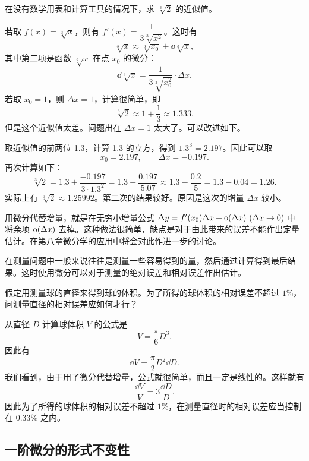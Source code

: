 \begin{xexample}[6.3.1]
在没有数学用表和计算工具的情况下，求 $\sqrt[3]{2}$ 的近似值。
\end{xexample}
\begin{xsolution}
若取 $f(x)=\sqrt[3]{x}$，则有 $f'(x)=\dfrac1{3\sqrt[3]{x^2}}$。这时有
\[
  \sqrt[3]{x}\approx\sqrt[3]{x_0}+\dd\sqrt[3]{x},
\]
其中第二项是函数 $\sqrt[3]{x}$ 在点 $x_0$ 的微分：
\[
  \dd\sqrt[3]{x}=\frac1{3\sqrt[3]{x_0^2}}\cdot\Delta x.
\]
若取 $x_0=1$，则 $\Delta x=1$，计算很简单，即
\[
  \sqrt[3]{2}\approx1+\frac13\approx1.333.
\]
但是这个近似值太差。问题出在 $\Delta x=1$ 太大了。可以改进如下。

取近似值的前两位 1.3，计算 1.3 的立方，得到 $1.3^3=2.197$。因此可以取
\[
  x_0=2.197,\qquad\Delta x=-0.197.
\]
再次计算如下：
\[
  \sqrt[3]{2}
  =1.3+\frac{-0.197}{3\cdot1.3^2}
  =1.3-\frac{0.197}{5.07}
  \approx1.3-\frac{0.2}{5}
  =1.3-0.04=1.26.
\]
实际上有 $\sqrt[3]{2}\approx1.25992$。第二次的结果较好。原因是这次的增量 $\Delta x$ 较小。
\end{xsolution}

\begin{xremark}
用微分代替增量，就是在无穷小增量公式 $\Delta y=f'(x_0)\Delta x+\littleo(\Delta x)\ (\Delta x\to0)$ 中将余项 $\mathrm{o}(\Delta x)$ 去掉。这种做法很简单，缺点是对于由此带来的误差不能作出定量估计。在第八章微分学的应用中将会对此作进一步的讨论。

在测量问题中一般来说往往是测量一些容易得到的量，然后通过计算得到最后结果。这时使用微分可以对于测量的绝对误差和相对误差作出估计。
\end{xremark}

\begin{xexample}[6.3.2]
假定用测量球的直径来得到球的体积。为了所得的球体积的相对误差不超过 $1\%$，问测量直径的相对误差应如何才行？
\end{xexample}
\begin{xsolution}
从直径 $D$ 计算球体积 $V$ 的公式是
\[
  V=\frac\pi6D^3.
\]
因此有
\[
  \dd V=\frac\pi2D^2\dd D.
\]
我们看到，由于用了微分代替增量，公式就很简单，而且一定是线性的。这样就有
\[
  \frac{\dd V}{V}=3\frac{\dd D}{D}.
\]
因此为了所得的球体积的相对误差不超过 $1\%$，在测量直径时的相对误差应当控制在 $0.33\%$ 之内。
\end{xsolution}

\subsection{一阶微分的形式不变性}

